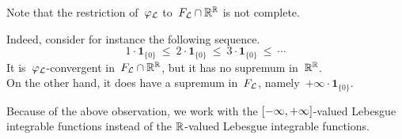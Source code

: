 \documentclass[main.tex]{subfiles}
\begin{document}
%
%
\begin{rem}
\label{R:non-finite-functions}
Note that the restriction of~$\varphi_{\mathcal{L}}$ to~$F_{\mathcal{L}}\cap \mathbb{R}^{\mathbb{R}}$
is not complete.

Indeed,
consider for instance
the following sequence.
\begin{equation*}
1\cdot\mathbf{1}_{\{0\}} 
\ \leq\   2\cdot\mathbf{1}_{\{0\}} 
\ \leq\   3\cdot\mathbf{1}_{\{0\}}
\ \leq\  \dotsb
\end{equation*}
It is~$\varphi_{\mathcal{L}}$-convergent
in~$F_{\mathcal{L}}\cap \mathbb{R}^{\mathbb{R}}$,
but it has no supremum in~$\mathbb{R}^{\mathbb{R}}$.\\
On the other hand,
it does have a supremum in~$F_{\mathcal{L}}$, 
namely~$+\infty\cdot \mathbf{1}_{\{0\}}$.

Because of the above observation,
we work with
the ${[-\infty,+\infty]}$-valued Lebesgue integrable functions
instead of the $\mathbb{R}$-valued Lebesgue integrable functions.
\end{rem}
%
%
\end{document}
